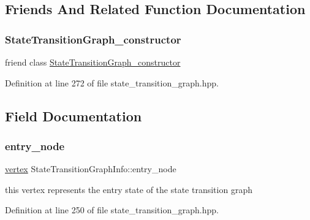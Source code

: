 \subsection{Friends And Related Function Documentation}
\mbox{\label{structStateTransitionGraphInfo_ad763807d92353814f2f1e7839d7eb408}} 
\subsubsection{\texorpdfstring{State\+Transition\+Graph\+\_\+constructor}{StateTransitionGraph\_constructor}}
{\footnotesize\ttfamily friend class \hyperlink{classStateTransitionGraph__constructor}{State\+Transition\+Graph\+\_\+constructor}\hspace{0.3cm}{\ttfamily [friend]}}



Definition at line 272 of file state\+\_\+transition\+\_\+graph.\+hpp.



\subsection{Field Documentation}
\mbox{\label{structStateTransitionGraphInfo_aceaab2d757838c7b009e6957ddf748d8}} 
\subsubsection{\texorpdfstring{entry\+\_\+node}{entry\_node}}
{\footnotesize\ttfamily \hyperlink{graph_8hpp_abefdcf0544e601805af44eca032cca14}{vertex} State\+Transition\+Graph\+Info\+::entry\+\_\+node}



this vertex represents the entry state of the state transition graph 



Definition at line 250 of file state\+\_\+transition\+\_\+graph.\+hpp.

